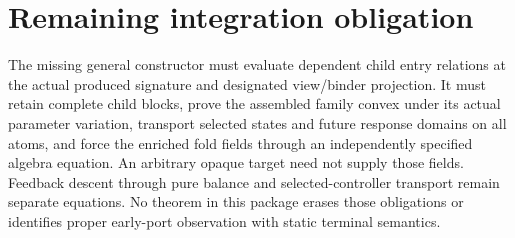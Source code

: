\documentclass[11pt]{article}
\begin{document}
\section{Remaining integration obligation}
The missing general constructor must evaluate dependent child entry relations at the actual produced signature and designated view/binder projection. It must retain complete child blocks, prove the assembled family convex under its actual parameter variation, transport selected states and future response domains on all atoms, and force the enriched fold fields through an independently specified algebra equation. An arbitrary opaque target need not supply those fields. Feedback descent through pure balance and selected-controller transport remain separate equations. No theorem in this package erases those obligations or identifies proper early-port observation with static terminal semantics.
\end{document}

